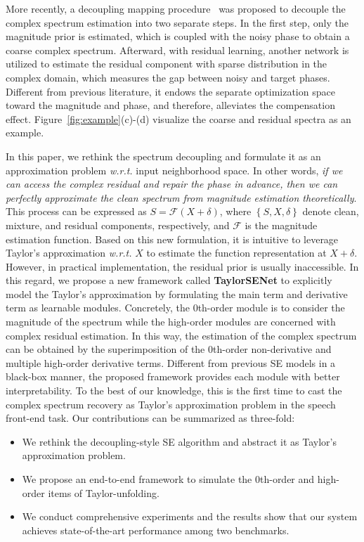 \documentclass{article}
\begin{document}
More recently, a decoupling mapping procedure~{\cite{li2021two}} was proposed to decouple the complex spectrum estimation into two separate steps. In the first step, only the magnitude prior is estimated, which is coupled with the noisy phase to obtain a coarse complex spectrum. Afterward, with residual learning, another network is utilized to estimate the residual component with sparse distribution in the complex domain, which measures the gap between noisy and target phases. Different from previous literature, it endows the separate optimization space toward the magnitude and phase, and therefore, alleviates the compensation effect. Figure~{\ref{fig:example}}(c)-(d) visualize the coarse and residual spectra as an example. 


In this paper, we rethink the spectrum decoupling and formulate it as an approximation problem \emph{w.r.t.} input neighborhood space. In other words, \textit{if we can access the complex residual and repair the phase in advance, then we can perfectly approximate the clean spectrum from magnitude estimation theoretically}. This process can be expressed as $S = \mathcal{F}\left(X + \delta\right)$, where $\left\{S, X, \delta\right\}$ denote clean, mixture, and residual components, respectively, and $\mathcal{F}$ is the magnitude estimation function. Based on this new formulation, it is intuitive to leverage Taylor's approximation \emph{w.r.t.} $X$ to estimate the function representation at $X + \delta$. However, in practical implementation, the residual prior is usually inaccessible. In this regard, we propose a new framework called \textbf{TaylorSENet} to explicitly model the Taylor's approximation by formulating the main term and derivative term as learnable modules. Concretely, the 0th-order module is to consider the magnitude of the spectrum while the high-order modules are concerned with complex residual estimation. In this way, the estimation of the complex spectrum can be obtained by the superimposition of the 0th-order non-derivative and multiple high-order derivative terms. Different from previous SE models in a black-box manner, the proposed framework provides each module with better interpretability. To the best of our knowledge, this is the first time to cast the complex spectrum recovery as Taylor's approximation problem in the speech front-end task. Our contributions can be summarized as three-fold:
\begin{itemize}
	\item We rethink the decoupling-style SE algorithm and abstract it as Taylor's approximation problem.
	\item We propose an end-to-end framework to simulate the 0th-order and high-order items of Taylor-unfolding.
	\item We conduct comprehensive experiments and the results show that our system achieves state-of-the-art performance among two benchmarks.
\end{itemize}
\vspace{-0.3cm}
\end{document}
